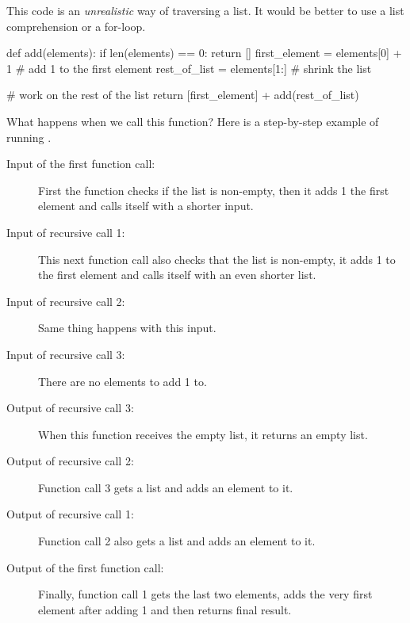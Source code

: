 \documentclass[11pt]{cselabheader}
\begin{document}
This code is an \textsl{unrealistic} way of traversing a list. It
would be better to use a list comprehension or a for-loop.

\begin{python3code}
def add(elements):
    if len(elements) == 0:
        return []
    first_element = elements[0] + 1  # add 1 to the first element
    rest_of_list = elements[1:]  # shrink the list

    # work on the rest of the list
    return [first_element] + add(rest_of_list)
\end{python3code}

What happens when we call this function? Here is a step-by-step
example of running .

\begin{description}
\item[Input of the first function call:] \pythoninline{[1, 2, 3]}

First the function checks if the list is non-empty, then it adds 1 the
first element and calls itself with a shorter input.

\item[Input of recursive call 1:] \pythoninline{[2, 3]}

This next function call also checks that the list is non-empty, it adds 1
to the first element and calls itself with an even shorter list.

\item[Input of recursive call 2:] \pythoninline{[3]}

Same thing happens with this input.

\item[Input of recursive call 3:] \pythoninline{[]}

There are no elements to add 1 to.

\item[Output of recursive call 3:] \pythoninline{[]}

When this function receives the empty list, it returns an empty list.

\item[Output of recursive call 2:] \pythoninline{[3 + 1] + []}

Function call 3 gets a list and adds an element to it.

\item[Output of recursive call 1:] \pythoninline{[2 + 1] + [3 + 1] + []}

Function call 2 also gets a list and adds an element to it.

\item[Output of the first function call:] \pythoninline{[3 + 1] + [2 + 1] + [3 + 1] + [] = [4, 3, 2]}

Finally, function call 1 gets the last two elements, adds the very
first element after adding 1 and then returns final result.
\end{description}
\end{document}

